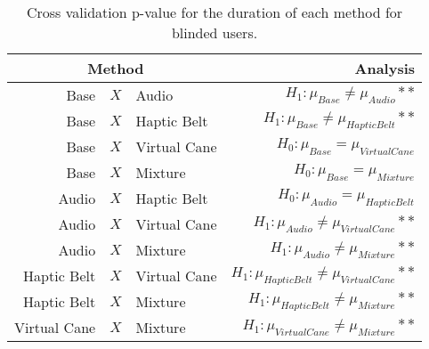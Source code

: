 
\begin{table}[!htb]
\centering
\caption{Cross validation p-value for the duration of each method for blinded users.}
\label{tab:lsd_duration}
\begin{tabular}{rclr}
\toprule
      \multicolumn{3}{c}{Method} &                                           Analysis \\
\midrule
              Base & $X$ & Audio &               $H_1 : \mu_{Base} \ne \mu_{Audio}**$ \\
        Base & $X$ & Haptic Belt &         $H_1 : \mu_{Base} \ne \mu_{Haptic Belt}**$ \\
       Base & $X$ & Virtual Cane &            $H_0 : \mu_{Base} = \mu_{Virtual Cane}$ \\
            Base & $X$ & Mixture &                 $H_0 : \mu_{Base} = \mu_{Mixture}$ \\
       Audio & $X$ & Haptic Belt &            $H_0 : \mu_{Audio} = \mu_{Haptic Belt}$ \\
      Audio & $X$ & Virtual Cane &       $H_1 : \mu_{Audio} \ne \mu_{Virtual Cane}**$ \\
           Audio & $X$ & Mixture &            $H_1 : \mu_{Audio} \ne \mu_{Mixture}**$ \\
Haptic Belt & $X$ & Virtual Cane & $H_1 : \mu_{Haptic Belt} \ne \mu_{Virtual Cane}**$ \\
     Haptic Belt & $X$ & Mixture &      $H_1 : \mu_{Haptic Belt} \ne \mu_{Mixture}**$ \\
    Virtual Cane & $X$ & Mixture &     $H_1 : \mu_{Virtual Cane} \ne \mu_{Mixture}**$ \\
\bottomrule
\end{tabular}
\end{table}

